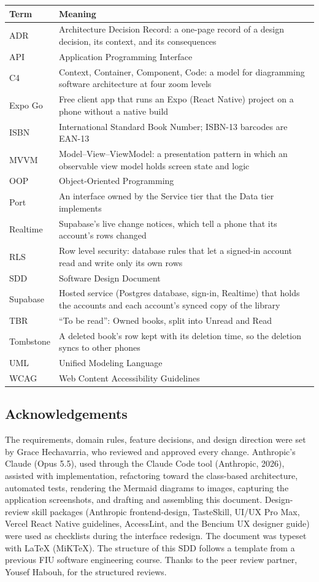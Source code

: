 \documentclass[12pt]{article}
\begin{document}
\begin{longtable}{|p{3cm}|p{11cm}|}
\hline
\textbf{Term} & \textbf{Meaning} \\
\hline
\endhead
ADR & Architecture Decision Record: a one-page record of a design decision, its context, and its consequences \\
API & Application Programming Interface \\
C4 & Context, Container, Component, Code: a model for diagramming software architecture at four zoom levels \\
Expo Go & Free client app that runs an Expo (React Native) project on a phone without a native build \\
ISBN & International Standard Book Number; ISBN-13 barcodes are EAN-13 \\
MVVM & Model--View--ViewModel: a presentation pattern in which an observable view model holds screen state and logic \\
OOP & Object-Oriented Programming \\
Port & An interface owned by the Service tier that the Data tier implements \\
Realtime & Supabase's live change notices, which tell a phone that its account's rows changed \\
RLS & Row level security: database rules that let a signed-in account read and write only its own rows \\
SDD & Software Design Document \\
Supabase & Hosted service (Postgres database, sign-in, Realtime) that holds the accounts and each account's synced copy of the library \\
TBR & ``To be read'': Owned books, split into Unread and Read \\
Tombstone & A deleted book's row kept with its deletion time, so the deletion syncs to other phones \\
UML & Unified Modeling Language \\
WCAG & Web Content Accessibility Guidelines \\
\hline
\end{longtable}

\subsection{Acknowledgements}

The requirements, domain rules, feature decisions, and design direction were set by Grace Hechavarria, who reviewed and approved every change. Anthropic's Claude (Opus 5.5), used through the Claude Code tool (Anthropic, 2026), assisted with implementation, refactoring toward the class-based architecture, automated tests, rendering the Mermaid diagrams to images, capturing the application screenshots, and drafting and assembling this document. Design-review skill packages (Anthropic frontend-design, TasteSkill, UI/UX Pro Max, Vercel React Native guidelines, AccessLint, and the Bencium UX designer guide) were used as checklists during the interface redesign. The document was typeset with \LaTeX{} (MiKTeX). The structure of this SDD follows a template from a previous FIU software engineering course. Thanks to the peer review partner, Yousef Habouh, for the structured reviews.
\end{document}
